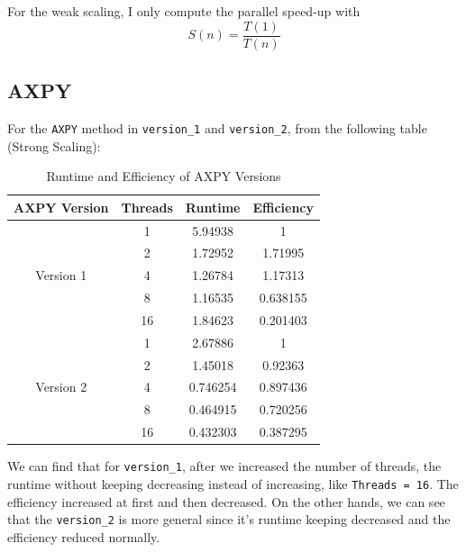 \documentclass[11pt]{article}
\begin{document}
For the weak scaling, I only compute the parallel speed-up with
\begin{equation*}
    S(n) = \frac{T(1)}{T(n)}
\end{equation*}

\subsection{AXPY}
For the \verb|AXPY| method in \verb|version_1| and \verb|version_2|, from the following table (Strong Scaling):
\begin{table}[H]
\centering
\begin{tabular}{|c|c|c|c|}
\hline
\textbf{AXPY Version} & \textbf{Threads} & \textbf{Runtime} & \textbf{Efficiency} \\ \hline
\multirow{5}{*}{Version 1} 
& 1  & 5.94938  & 1        \\ \cline{2-4}
& 2  & 1.72952  & 1.71995  \\ \cline{2-4}
& 4  & 1.26784  & 1.17313  \\ \cline{2-4}
& 8  & 1.16535  & 0.638155 \\ \cline{2-4}
& 16 & 1.84623  & 0.201403 \\ \hline
\multirow{5}{*}{Version 2} 
& 1  & 2.67886  & 1        \\ \cline{2-4}
& 2  & 1.45018  & 0.92363  \\ \cline{2-4}
& 4  & 0.746254 & 0.897436 \\ \cline{2-4}
& 8  & 0.464915 & 0.720256 \\ \cline{2-4}
& 16 & 0.432303 & 0.387295 \\ \hline
\end{tabular}
\caption{Runtime and Efficiency of AXPY Versions}
\label{tab:AXPY}
\end{table}
We can find that for \verb|version_1|, after we increased the number of threads, the runtime without keeping decreasing instead of increasing, like \verb|Threads = 16|. The efficiency increased at first and then decreased. On the other hands, we can see that the \verb|version_2| is more general since it's runtime keeping decreased and the efficiency reduced normally. 

\newpage
\end{document}
